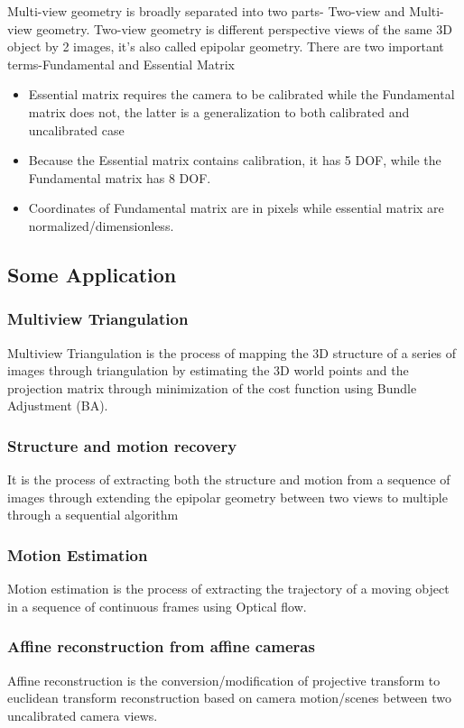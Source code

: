 \documentclass{article}[11pt]
\begin{document}
Multi-view geometry is broadly separated into two parts- Two-view and Multi-view geometry.
Two-view geometry is different perspective views of the same 3D object by 2 images, it's also called epipolar geometry. There are two important terms-Fundamental and Essential Matrix
\begin{itemize}
    \item Essential matrix requires the camera to be calibrated while the Fundamental matrix does not, the latter is a generalization to both calibrated and uncalibrated case
    \item Because the Essential matrix contains calibration, it has 5 DOF, while the Fundamental matrix has 8 DOF.
    \item Coordinates of Fundamental matrix are in pixels while essential matrix are normalized/dimensionless.
\end{itemize}


\subsection{Some Application}
\subsubsection{Multiview Triangulation}
Multiview Triangulation is the process of mapping the 3D structure of a series of images through triangulation by estimating the 3D world points and the projection matrix through minimization of the cost function using Bundle Adjustment (BA).

\subsubsection{Structure and motion recovery}
It is the process of extracting both the structure and motion from a sequence of images through extending the epipolar geometry between two views to multiple through a sequential algorithm 
\subsubsection{Motion Estimation}
Motion estimation is the process of extracting the trajectory of a moving object in a sequence of continuous frames using Optical flow.

\subsubsection{Affine reconstruction from affine cameras }
Affine reconstruction is the conversion/modification of projective transform to euclidean transform reconstruction based on camera motion/scenes between two uncalibrated camera views.
\end{document}
